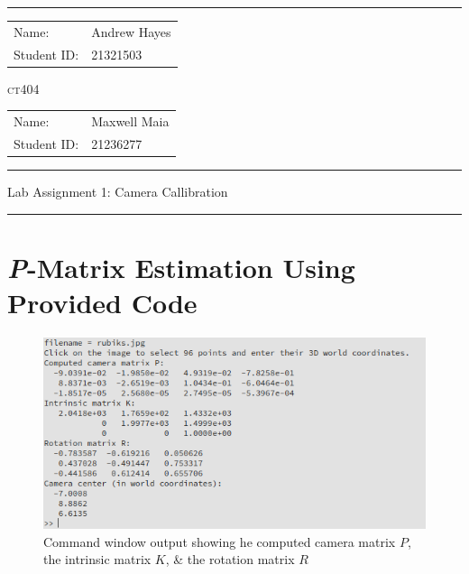 \documentclass[a4paper]{article}
\begin{document}
\hrule \medskip
\begin{minipage}{0.295\textwidth} 
    \raggedright
    \footnotesize 
    \begin{tabular}{@{}l l} %
        Name: & Andrew Hayes \\
        Student ID: & 21321503 \\
    \end{tabular}
\end{minipage}
\begin{minipage}{0.4\textwidth} 
    \centering 
    \vspace{0.4em}
    \LARGE 
    \textsc{ct404} \\ 
\end{minipage}
\begin{minipage}{0.295\textwidth} 
    \raggedleft
    \footnotesize 
    \begin{tabular}{@{}l l} %
        Name: & Maxwell Maia \\
        Student ID: & 21236277 \\
    \end{tabular}
\end{minipage}
\smallskip
\hrule 
\begin{center}
    \normalsize
    Lab Assignment 1: Camera Callibration
\end{center}
\hrule

\section{\textit{P}-Matrix Estimation Using Provided Code}
\begin{figure}[H]
    \centering
    \includegraphics[width=\textwidth]{./images/1.1.png}
    \caption{ Command window output showing he computed camera matrix $P$, the intrinsic matrix $K$, \& the rotation matrix $R$ }
\end{figure}
\end{document}
